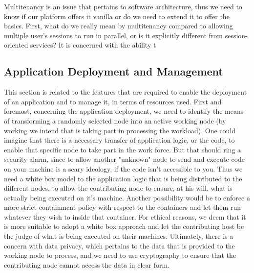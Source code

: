 \documentclass[11pt]{amsart}
\begin{document}
\begin{enumarate}
          Multitenancy is an issue that pertains to software architecture, thus we need
          to know if our platform offers it vanilla or do we need to extend it to offer
          the basics. First, what do we really mean by multitenancy compared to allowing
          multiple user's sessions to run in parallel, or is it explicitly different from
          session-oriented services? It is concerned with the ability t
          
          \subsection{Application Deployment and Management}
          This section is related to the features that are required to enable the
          deployment of an application and to manage it, in terms of resources used. First
          and foremost, concerning the application deployment, we need to identify the
          means of transforming a randomly selected node into an active working node (by
          working we intend that is taking part in processing the workload). One could
          imagine that there is a necessary transfer of application logic, or the code, to
          enable that specific node to take part in the work force. But that should ring a
          security alarm, since to allow another "unknown" node to send and execute code
          on your machine is a scary ideology, if the code isn't accessible to you. Thus
          we need a white box model to the application logic that is being distributed to
          the different nodes, to allow the contributing node to ensure, at his will, what
          is actually being executed on it's machine. Another possibility would be to
          enforce a more strict containment policy with respect to the
          containers and let them run whatever they wish to inside that container. For
          ethical reasons, we deem that it is more suitable to adopt a white box approach
          and let the contributing host be the judge of what is being executed on their
          machines. Ultimately, there is a concern with data privacy, which pertains to
          the data that is provided to the working node to process, and we need to use
          cryptography to ensure that the contributing node cannot access the data in
          clear form.
          

\end{enumarate}
\end{document}

